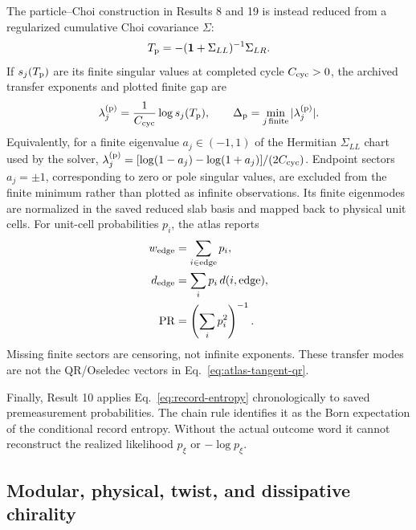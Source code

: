 \documentclass[aps,prb,twocolumn,floatfix,nofootinbib,superscriptaddress]{revtex4-2}
\begin{document}
The particle--Choi construction in Results 8 and 19 is instead reduced from a regularized
cumulative Choi covariance $\Sigma$:
\begin{equation}
 T_{\rm p}=-(\mathbf{1}+\Sigma_{LL})^{-1}\Sigma_{LR}.
 \label{eq:atlas-particle-choi}
\end{equation}
If $s_j(T_{\rm p})$ are its finite singular values at completed cycle
$C_{\rm cyc}>0$, the archived transfer exponents and plotted finite gap are
\begin{equation}
 \lambda_j^{({\rm p})}=\frac{1}{C_{\rm cyc}}\log s_j(T_{\rm p}),
 \qquad
 \Delta_{\rm p}=\min_{j\,{\rm finite}}|\lambda_j^{({\rm p})}|.
 \label{eq:atlas-particle-choi-exponents}
\end{equation}
Equivalently, for a finite eigenvalue $a_j\in(-1,1)$ of the Hermitian
$\Sigma_{LL}$ chart used by the solver,
$\lambda_j^{({\rm p})}=[\log(1-a_j)-\log(1+a_j)]/(2C_{\rm cyc})$.
Endpoint sectors $a_j=\pm1$, corresponding to zero or pole singular values, are excluded
from the finite minimum rather than plotted as infinite observations.
Its finite eigenmodes are normalized in the saved reduced slab basis and mapped back to
physical unit cells.  For unit-cell probabilities $p_i$, the atlas reports
\begin{equation}
 \begin{aligned}
 w_{\rm edge}&=\sum_{i\in{\rm edge}}p_i,\\
 d_{\rm edge}&=\sum_i p_i\,d(i,{\rm edge}),\\
 {\rm PR}&=\left(\sum_i p_i^2\right)^{-1}.
 \end{aligned}
 \label{eq:atlas-transfer-mode-stats}
\end{equation}
Missing finite sectors are censoring, not infinite exponents.  These transfer modes are
not the QR/Oseledec vectors in Eq.~\eqref{eq:atlas-tangent-qr}.

Finally, Result 10 applies Eq.~\eqref{eq:record-entropy} chronologically to saved
premeasurement probabilities.  The chain rule identifies it as the Born expectation of
the conditional record entropy.  Without the actual outcome word it cannot reconstruct
the realized likelihood $p_\xi$ or $-\log p_\xi$.

\subsection{Modular, physical, twist, and dissipative chirality}
\label{app:chirality-formalism}
\end{document}
